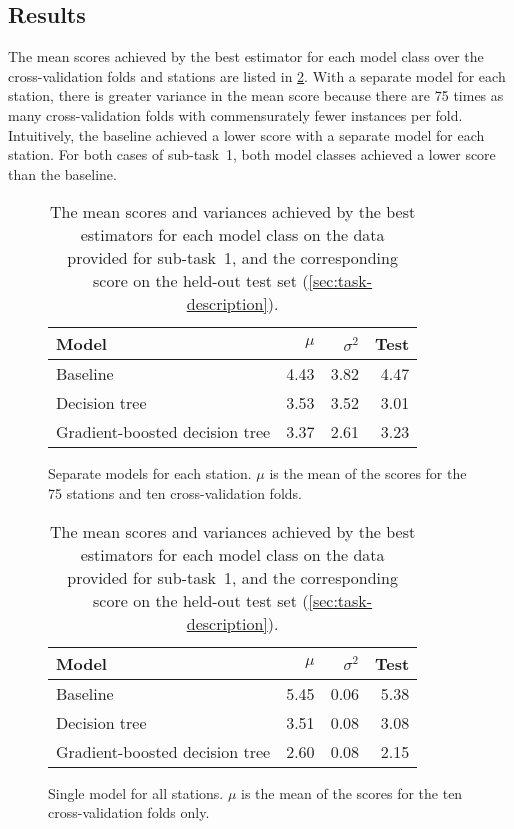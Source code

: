 \documentclass[11pt]{extarticle}
\newcommand{\subfigurespace}{\par\bigskip\bigskip}
\begin{document}
\subsection{Results}
\label{sec:subtask-1:results}

The mean scores achieved by the best estimator for each model class over the
cross-validation folds and stations are listed in \cref{tab:subtask-1:results}.
With a separate model for each station, there is greater variance in the mean score
because there are 75 times as many cross-validation folds with commensurately fewer
instances per fold.
Intuitively, the baseline achieved a lower score with a separate model for each
station.
For both cases of sub-task~1, both model classes achieved a lower score than the
baseline.

\begin{table}
  \centering
  \begin{subfigure}{\textwidth}
    \centering
    \begin{tabular}{lrrr}
      \toprule
      Model                          & $\mu$ & $\sigma^2$ & Test
      \\
      \midrule
      Baseline                       & 4.43  & 3.82       & 4.47
      \\
      Decision tree                  & 3.53  & 3.52       & 3.01
      \\
      Gradient-boosted decision tree & 3.37  & 2.61       & 3.23
      \\
      \bottomrule
    \end{tabular}
    \caption{Separate models for each station. $\mu$ is the mean of the scores for the 75 stations
      and ten cross-validation folds.}
    \label{tab:subtask-1:results-1}
  \end{subfigure}
  \subfigurespace
  \begin{subfigure}{\textwidth}
    \centering
    \begin{tabular}{lrrr}
      \toprule
      Model                          & $\mu$ & $\sigma^2$ & Test
      \\
      \midrule
      Baseline                       & 5.45  & 0.06       & 5.38
      \\
      Decision tree                  & 3.51  & 0.08       & 3.08
      \\
      Gradient-boosted decision tree & 2.60  & 0.08       & 2.15
      \\
      \bottomrule
    \end{tabular}
    \caption{Single model for all stations. $\mu$ is the mean of the scores for the ten
      cross-validation folds only.}
    \label{tab:subtask-1:results-2}
  \end{subfigure}
  \caption{The mean scores and variances achieved by the best estimators for each model
    class on the data provided for sub-task~1, and the corresponding score on the
    held-out test set (\cref{sec:task-description}).
  }
  \label{tab:subtask-1:results}
\end{table}
\end{document}
